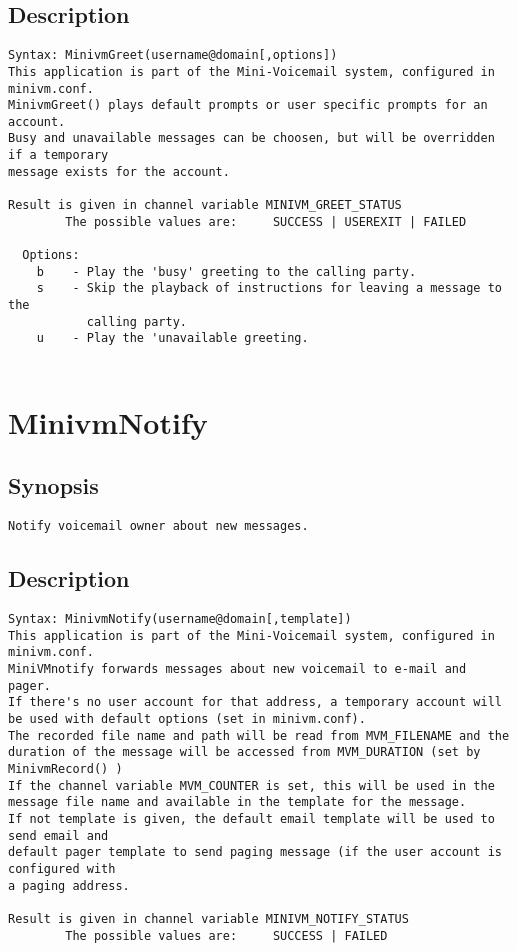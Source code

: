 \subsection{Description}
\begin{verbatim}
Syntax: MinivmGreet(username@domain[,options])
This application is part of the Mini-Voicemail system, configured in minivm.conf.
MinivmGreet() plays default prompts or user specific prompts for an account.
Busy and unavailable messages can be choosen, but will be overridden if a temporary
message exists for the account.

Result is given in channel variable MINIVM_GREET_STATUS
        The possible values are:     SUCCESS | USEREXIT | FAILED

  Options:
    b    - Play the 'busy' greeting to the calling party.
    s    - Skip the playback of instructions for leaving a message to the
           calling party.
    u    - Play the 'unavailable greeting.


\end{verbatim}


\section{MinivmNotify}
\subsection{Synopsis}
\begin{verbatim}
Notify voicemail owner about new messages.
\end{verbatim}
\subsection{Description}
\begin{verbatim}
Syntax: MinivmNotify(username@domain[,template])
This application is part of the Mini-Voicemail system, configured in minivm.conf.
MiniVMnotify forwards messages about new voicemail to e-mail and pager.
If there's no user account for that address, a temporary account will
be used with default options (set in minivm.conf).
The recorded file name and path will be read from MVM_FILENAME and the 
duration of the message will be accessed from MVM_DURATION (set by MinivmRecord() )
If the channel variable MVM_COUNTER is set, this will be used in the
message file name and available in the template for the message.
If not template is given, the default email template will be used to send email and
default pager template to send paging message (if the user account is configured with
a paging address.

Result is given in channel variable MINIVM_NOTIFY_STATUS
        The possible values are:     SUCCESS | FAILED


\end{verbatim}


